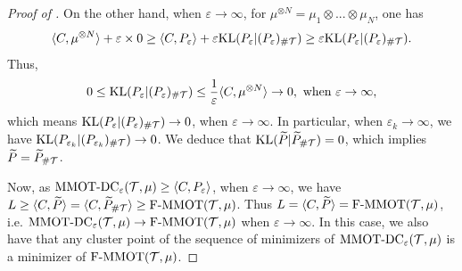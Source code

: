 \begin{proof}[Proof of ]
On the other hand, when $\varepsilon \to \infty$, for $\mu^{\otimes N} = \mu_1 \otimes ... \otimes \mu_N$, one has
\begin{equation}
  \langle C, \mu^{\otimes N} \rangle + \varepsilon \times 0 \geq \langle C, P_{\varepsilon} \rangle +
  \varepsilon \text{KL}(P_{\varepsilon} \vert (P_{\varepsilon})_{\# \mathcal T})
  \geq \varepsilon \text{KL}(P_{\varepsilon} \vert (P_{\varepsilon})_{\# \mathcal T}).
\end{equation}
Thus,
\begin{equation}
  0 \leq \text{KL}(P_{\varepsilon} \vert (P_{\varepsilon})_{\# \mathcal T}) \leq
  \frac{1}{\varepsilon} \langle C, \mu^{\otimes N} \rangle \to 0, \text{ when } \varepsilon \to \infty,
\end{equation}
which means $\text{KL}(P_{\varepsilon} \vert (P_{\varepsilon})_{\# \mathcal T}) \to 0$, when $\varepsilon \to \infty$. In particular,
when $\varepsilon_k \to \infty$, we have $\text{KL}(P_{\varepsilon_k} \vert (P_{\varepsilon_k})_{\# \mathcal T}) \to 0$. We deduce that
$\text{KL}(\widetilde{P} \vert \widetilde{P}_{\# \mathcal T}) = 0$, which implies $\widetilde{P} = \widetilde{P}_{\# \mathcal T}$.

Now, as $\text{MMOT-DC}_{\varepsilon}(\mathcal T, \mu) \geq \langle C, P_{\varepsilon} \rangle$,
when $\varepsilon \to \infty$, we have $L \geq \langle C, \widetilde{P} \rangle =
\langle C, \widetilde{P}_{\# \mathcal T} \rangle \geq \text{F-MMOT}(\mathcal T, \mu)$.
Thus $L = \langle C, \widetilde{P} \rangle = \text{F-MMOT}(\mathcal T, \mu)$, i.e.
$\text{MMOT-DC}_{\varepsilon}(\mathcal T, \mu) \to \text{F-MMOT}(\mathcal T, \mu)$ when $\varepsilon \to \infty$. In this case,
we also have that any cluster point of the sequence of minimizers of $\text{MMOT-DC}_{\varepsilon}(\mathcal T, \mu)$
is a minimizer of $\text{F-MMOT}(\mathcal T, \mu)$.
\end{proof}

